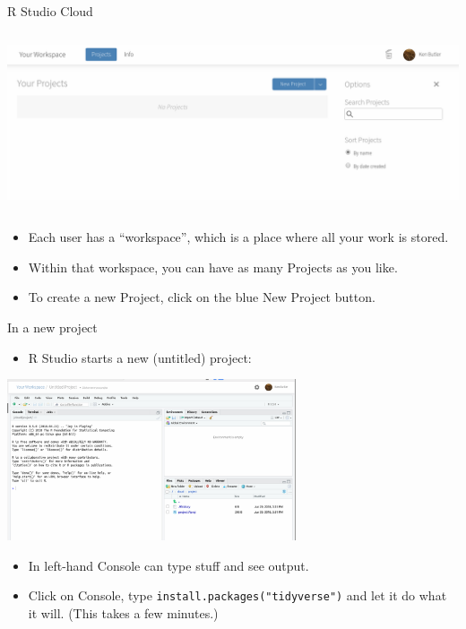 \documentclass[
  ignorenonframetext,
]{beamer}
\providecommand{\tightlist}{%
  \setlength{\itemsep}{0pt}\setlength{\parskip}{0pt}}
\begin{document}
\begin{frame}{R Studio Cloud}
\protect\hypertarget{r-studio-cloud}{}

\includegraphics[width=\textwidth,height=2.08333in]{Screenshot_2018-06-29_15-24-21.png}

\begin{itemize}
\tightlist
\item
  Each user has a ``workspace'', which is a place where all your work is
  stored.
\item
  Within that workspace, you can have as many Projects as you like.
\item
  To create a new Project, click on the blue New Project button.
\end{itemize}

\end{frame}

\begin{frame}{In a new project}
\protect\hypertarget{in-a-new-project}{}

\begin{itemize}
\tightlist
\item
  R Studio starts a new (untitled) project:
\end{itemize}

\includegraphics[width=\textwidth,height=1.875in]{Screenshot_2018-06-29_15-32-48.png}

\begin{itemize}
\tightlist
\item
  In left-hand Console can type stuff and see output.
\item
  Click on Console, type \texttt{install.packages("tidyverse")} and let
  it do what it will. (This takes a few minutes.)
\end{itemize}

\end{frame}
\end{document}
